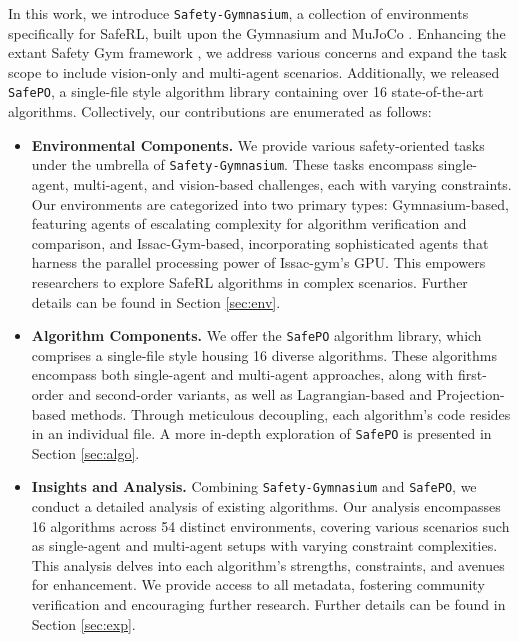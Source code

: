 \documentclass{article}
\begin{document}
In this work, we introduce \texttt{Safety-Gymnasium}, a collection of environments specifically for SafeRL, built upon the Gymnasium \cite{brockman2016openai, Gymnasium} and MuJoCo \cite{todorov2012mujoco}. Enhancing the extant Safety Gym framework \cite{ray2019benchmarking}, we address various concerns and expand the task scope to include vision-only and multi-agent scenarios. Additionally, we released \texttt{SafePO}, a single-file style algorithm library containing over 16 state-of-the-art algorithms.  Collectively, our contributions are enumerated as follows:
\begin{itemize}[left=0.3cm]
    \item \textbf{Environmental Components.} We provide various safety-oriented tasks under the umbrella of \texttt{Safety-Gymnasium}. These tasks encompass single-agent, multi-agent, and vision-based challenges, each with varying constraints. Our environments are categorized into two primary types: Gymnasium-based, featuring agents of escalating complexity for algorithm verification and comparison, and Issac-Gym-based, incorporating sophisticated agents that harness the parallel processing power of Issac-gym's GPU. This empowers researchers to explore SafeRL algorithms in complex scenarios. Further details can be found in Section \ref{sec:env}.
    \item \textbf{Algorithm Components.} We offer the \texttt{SafePO} algorithm library, which comprises a single-file style housing 16 diverse algorithms. These algorithms encompass both single-agent and multi-agent approaches, along with first-order and second-order variants, as well as Lagrangian-based and Projection-based methods. Through meticulous decoupling, each algorithm's code resides in an individual file. A more in-depth exploration of \texttt{SafePO} is presented in Section \ref{sec:algo}.
    \item \textbf{Insights and Analysis.} Combining \texttt{Safety-Gymnasium} and \texttt{SafePO}, we conduct a detailed analysis of existing algorithms. Our analysis encompasses 16 algorithms across 54 distinct environments, covering various scenarios such as single-agent and multi-agent setups with varying constraint complexities. This analysis delves into each algorithm's strengths, constraints, and avenues for enhancement. We provide access to all metadata, fostering community verification and encouraging further research. Further details can be found in Section \ref{sec:exp}.
\end{itemize}
\end{document}
